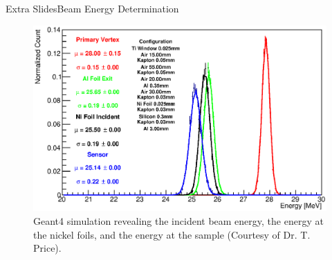 \documentclass{beamer}
\begin{document}
\begin{frame}{Extra Slides}{Beam Energy Determination}
    \begin{figure}
        \centering
        \includegraphics[width = 0.8\linewidth]{28MeV_incidentEnergy.eps}
        \caption{Geant4 simulation revealing the incident beam energy, the energy at the nickel foils, and the energy at the sample (Courtesy of Dr. T. Price).}
    \end{figure}
\end{frame}
\end{document}
